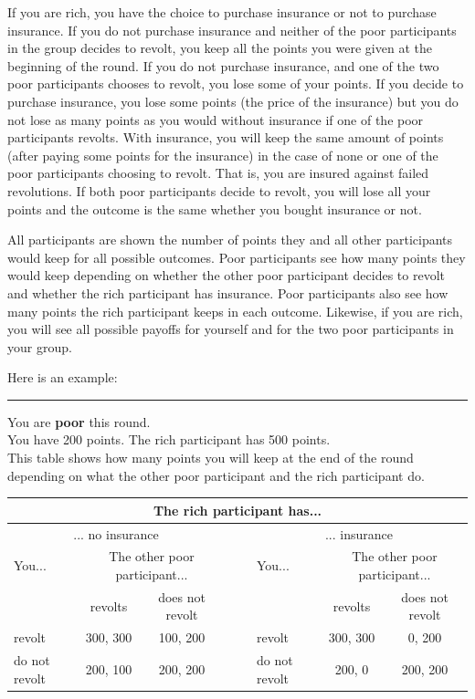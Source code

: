 \documentclass[12pt]{article}
\begin{document}
	If you are rich, you have the choice to purchase insurance or not to 
	purchase insurance. If you do not purchase insurance and neither of the 
	poor participants in the group decides to revolt, you keep all the points 
	you were given at the beginning of the round. If you do not purchase 
	insurance, and one of the two poor participants chooses to revolt, you lose 
	some of your points. If you decide to purchase insurance, you lose some 
	points (the price of the insurance) but you do not lose as many points as 
	you would without insurance if one of the poor participants revolts. With 
	insurance, you will keep the same amount of points (after paying some 
	points for the insurance) in the case of none or one of the poor 
	participants choosing to revolt. That is, you are insured against failed 
	revolutions. If both poor participants decide to revolt, you will lose all 
	your points and the outcome is the same whether you bought insurance or not.
	
	All participants are shown the number of points they and all other 
	participants would keep for all possible outcomes. Poor participants see 
	how many points they would keep depending on whether the other poor 
	participant decides to revolt and whether the rich participant has 
	insurance. Poor participants also see how many points the rich participant 
	keeps in each outcome. Likewise, if you are rich, you will see all possible 
	payoffs for yourself and for the two poor participants in your group.
	
	Here is an example:
	
	\noindent\rule[0.5ex]{\linewidth}{1pt}
		You are \textbf{poor} this round.\\		
		You have 200 points. The rich participant has 500 points.\\		
		This table shows how many points you will keep at the end of the round 
		depending on what the other poor participant and the rich participant 
		do.
		
	\begin{adjustwidth*}{-2cm}{-2cm}
		\centering
		\begin{tabular}{l|c|c|c|cl|c|c|}
			\multicolumn{8}{c}{The rich participant has...}\\
			\hline
			\multicolumn{3}{c}{... no insurance} && \multicolumn{1}{c}{}&
			\multicolumn{3}{c}{... insurance}\\
			You... &\multicolumn{2}{c}{The other poor participant...} 
			&&  & You...
			&\multicolumn{2}{c}{The other poor participant...}\\
			\cline{1-3}\cline{6-8}
			& revolts & does not revolt &&&& revolts & does not 
			revolt\\
			\cline{2-3}\cline{7-8}
			revolt & 300, 300 & 100, 200 &&& revolt & 300, 300 & 0, 200\\
			\cline{1-3}\cline{6-8}
			do not revolt & 200, 100 & 200, 200 &&& do not revolt &200, 0 & 
			200, 200\\
			\cline{2-3}\cline{7-8}
		\end{tabular}
	\end{adjustwidth*}
	
\end{document}
